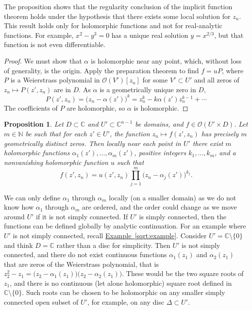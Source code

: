 \documentclass[12pt,openany]{book}
\newcommand{\C}{{\mathbb{C}}}
\newcommand{\N}{{\mathbb{N}}}
\newcommand{\sO}{{\mathscr{O}}}
\theoremstyle{plain}
\newtheorem{prop}[thm]{Proposition}
\theoremstyle{remark}
\theoremstyle{definition}
\theoremstyle{exercise}
\theoremstyle{example}
\newcommand{\exampleref}[1]{\hyperref[#1]{Example~\ref*{#1}}}
\begin{document}
The proposition shows that the regularity conclusion of the implicit
function theorem holds under the hypothesis that there exists some local
solution for $z_n$.  This result holds only for holomorphic
functions and not for real-analytic functions.  For example, $x^2-y^3 = 0$ has a
unique real solution $y = x^{2/3}$, but that function is not even
differentiable.

\begin{proof}
We must show that $\alpha$ 
is holomorphic near any point, which, without loss
of generality, is the origin.
Apply the preparation
theorem to find $f = u P$,
where $P$ is a
Weierstrass polynomial in $\sO(V')[z_n]$ for some $V' \subset U'$
and all zeros of $z_n \mapsto P(z',z_n)$ are in $D$.
As $\alpha$ is a geometrically unique zero in $D$,
\begin{equation*}
P(z',z_n) = {\bigl(z_n-\alpha(z') \bigr)}^k = z_n^k - k \alpha(z') z_n^{k-1}
+ \cdots
\end{equation*}
The coefficients of $P$ are holomorphic, so $\alpha$ is holomorphic.
\end{proof}

\begin{prop} \label{prop:zeroshol}
Let $D \subset \C$ and $U' \subset \C^{n-1}$
be domains,
and
$f \in \sO(U' \times D)$.
Let $m \in \N$ be such that
for each $z' \in U'$, the function $z_n \mapsto f(z',z_n)$ has
precisely $m$ geometrically distinct zeros.
Then locally near each point in $U'$ there exist $m$ holomorphic functions
$\alpha_1(z'),\ldots,\alpha_m(z')$,
positive integers
$k_1,\ldots,k_m$,
and a nonvanishing holomorphic function $u$
such that
\begin{equation*}
f(z',z_n) = u(z',z_n) \prod_{j=1}^m {\bigl( z_n - \alpha_j(z') \bigr)}^{k_j}
.
\end{equation*}
\end{prop}

We can only define $\alpha_1$ through $\alpha_m$ locally (on a
smaller domain) as we do not know
how $\alpha_1$ through $\alpha_m$ are ordered, and the order could change 
as we move around 
$U'$ if it is not simply connected.  If $U'$ is simply connected, then
the functions can be defined globally by analytic continuation.
For an example where $U'$ is not simply connected,
recall \exampleref{sqrt:example}. Consider $U' = \C \setminus \{ 0 \}$ and
think $D=\C$ rather than a disc for simplicity.  Then $U'$ is not simply
connected, and there do not exist continuous functions
$\alpha_1(z_1)$ and
$\alpha_2(z_1)$ that are zeros
of the Weierstrass polynomial, that is
$z_2^2 - z_1 =
\bigl(z_2-\alpha_1(z_1) \bigr)
\bigl(z_2-\alpha_2(z_1) \bigr)$.
These would be the two square roots of $z_1$, and there is no continuous
(let alone holomorphic) square root defined in $\C \setminus \{ 0 \}$.
Such roots can be chosen to be holomorphic on any smaller
simply connected open subset of $U'$, for
example, on any disc $\Delta \subset U'$.
\end{document}
